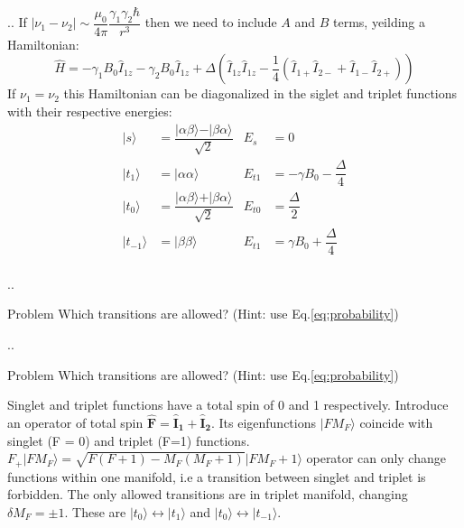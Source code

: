 \documentclass[handout]{beamer}
\begin{document}
\begin{frame}{\thesection.\thesubsection. \insertsubsection}
   If  $\mid \nu_1 -\nu_2 \mid \sim \dfrac{\mu_0}{4 \pi} \dfrac{\gamma_1 \gamma_2 \hbar}{r^3}$ then we need to include $A$ and $B$ terms, yeilding a Hamiltonian:
   \begin{equation}
     \hat{H} = -\gamma_1 B_0 \hat{I}_{1z} -\gamma_2 B_0 \hat{I}_{1z}  + \Delta ( \hat{I}_{1z} \hat{I}_{1z}  - \dfrac{1}{4} (\hat{I}_{1+} \hat{I}_{2-} + \hat{I}_{1-} \hat{I}_{2+} ) )  
   \end{equation}
   If $\nu_1 = \nu_2 $ this Hamiltonian can be diagonalized in the siglet and triplet functions with their respective energies:
   \begin{equation}
	   \begin{array}{clcl}	      
     	   \vert s \rangle &= \dfrac{\vert \alpha \beta \rangle - \vert  \beta \alpha \rangle}{\sqrt{2}} &  E_s &= 0 \\
	      \vert t_1 \rangle &=  \vert \alpha \alpha \rangle & E_{t1} &= -\gamma B_0 - \dfrac{\Delta}{4}\\
	      \vert t_0 \rangle &=  \dfrac{\vert \alpha \beta \rangle + \vert  \beta \alpha \rangle}{\sqrt{2}} & E_{t0} &= \dfrac{\Delta}{2} \\
	      \vert t_{-1} \rangle &= \vert \beta \beta \rangle	& E_{t1} &= \gamma B_0 + \dfrac{\Delta}{4}\\      
	   \end{array}   
   \end{equation}
\end{frame}

\begin{frame}{\thesection.\thesubsection. \insertsubsection}
    \begin{block}{Problem}
    	Which transitions are allowed? (Hint: use Eq.\ref{eq:probability})
    \end{block}    
\end{frame}

\begin{frame}{\thesection.\thesubsection. \insertsubsection}
	\begin{block}{Problem}
		Which transitions are allowed? (Hint: use Eq.\ref{eq:probability})
	\end{block}
	Singlet and triplet functions have a total spin of 0 and 1 respectively.  
	Introduce an operator of total spin $\bm{\hat{F}} = \bm{\hat{I}_{1}} + \bm{\hat{I}_2}$.  Its eigenfunctions $\vert F M_F \rangle$ coincide with singlet (F = 0) and triplet (F=1) functions. 
	$F_{+} \vert F M_F \rangle = \sqrt{F(F+1)-M_F(M_F+1)} \vert F M_F+1 \rangle$ operator can only change functions within one manifold, i.e a transition between singlet and triplet is forbidden.
	The only allowed transitions are in triplet manifold, changing $\delta M_F = \pm 1$. These are $\vert t_0 \rangle \leftrightarrow \vert t_1 \rangle$ and  $\vert t_0 \rangle \leftrightarrow \vert t_{-1} \rangle$.
\end{frame}
\end{document}
